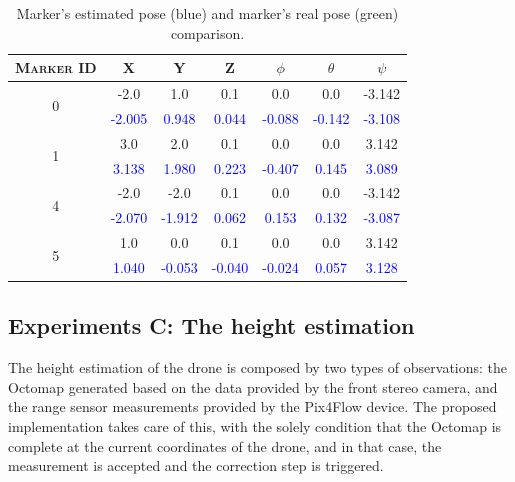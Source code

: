 \begin{table}
    \centering
    \begin{tabular}{ccccccc}
        \toprule
        \textsc{Marker ID} & X & Y & Z & $\phi$ & $\theta$ & $\psi$ \\
        \midrule
        \multirow{2}{*}{0} & \textcolor{OliveGreen}{-2.0}& \textcolor{OliveGreen}{1.0}& \textcolor{OliveGreen}{0.1}& \textcolor{OliveGreen}{0.0}& \textcolor{OliveGreen}{0.0}& \textcolor{OliveGreen}{-3.142}\\
        & \textcolor{blue}{-2.005}& \textcolor{blue}{0.948}& \textcolor{blue}{0.044}& \textcolor{blue}{-0.088}& \textcolor{blue}{-0.142}& \textcolor{blue}{-3.108}\\
        \midrule
        \multirow{2}{*}{1} & \textcolor{OliveGreen}{3.0}& \textcolor{OliveGreen}{2.0}& \textcolor{OliveGreen}{0.1}& \textcolor{OliveGreen}{0.0}& \textcolor{OliveGreen}{0.0}& \textcolor{OliveGreen}{3.142}\\
        & \textcolor{blue}{3.138}& \textcolor{blue}{1.980}& \textcolor{blue}{0.223}& \textcolor{blue}{-0.407}& \textcolor{blue}{0.145}& \textcolor{blue}{3.089}\\
        \midrule
        \multirow{2}{*}{4} & \textcolor{OliveGreen}{-2.0}& \textcolor{OliveGreen}{-2.0}& \textcolor{OliveGreen}{0.1}& \textcolor{OliveGreen}{0.0}& \textcolor{OliveGreen}{0.0}& \textcolor{OliveGreen}{-3.142}\\
        & \textcolor{blue}{-2.070}& \textcolor{blue}{-1.912}& \textcolor{blue}{0.062}& \textcolor{blue}{0.153}& \textcolor{blue}{0.132}& \textcolor{blue}{-3.087}\\
        \midrule
        \multirow{2}{*}{5} & \textcolor{OliveGreen}{1.0}& \textcolor{OliveGreen}{0.0}& \textcolor{OliveGreen}{0.1}& \textcolor{OliveGreen}{0.0}& \textcolor{OliveGreen}{0.0}& \textcolor{OliveGreen}{3.142}\\
        & \textcolor{blue}{1.040}& \textcolor{blue}{-0.053}& \textcolor{blue}{-0.040}& \textcolor{blue}{-0.024}& \textcolor{blue}{0.057}& \textcolor{blue}{3.128}\\
        \bottomrule
    \end{tabular}
    \caption[Marker's estimated pose]{Marker's estimated pose (blue) and marker's real pose (green) comparison.}
    \label{tab:chapter3:simulated:experiments:b:poses}
\end{table}

\subsection{Experiments C: The height estimation}
\label{subsec:chapter3:simulation:c}
The height estimation of the drone is composed by two types of observations: the Octomap generated based on the data provided by the front stereo camera, and the range sensor measurements provided by the Pix4Flow device. The proposed implementation takes care of this, with the solely condition that the Octomap is complete at the current coordinates of the drone, and in that case, the measurement is accepted and the correction step is triggered. \\

